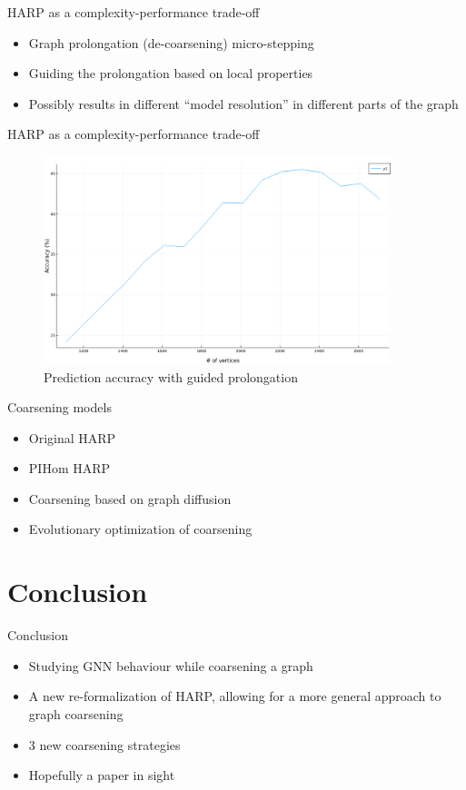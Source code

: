 \documentclass[10pt]{beamer}
\begin{document}
\begin{frame}{HARP as a complexity-performance trade-off}
	\begin{itemize}
		\item Graph prolongation (de-coarsening) micro-stepping
		\item Guiding the prolongation based on local properties
		\item Possibly results in different \enquote{model resolution} in different parts of the graph
	\end{itemize}
\end{frame}

\begin{frame}{HARP as a complexity-performance trade-off}
	\begin{figure}
		\centering
		\includegraphics[width=0.9\textwidth]{images/accuracy-size.png}
		\caption{Prediction accuracy with guided prolongation}
	\end{figure}
\end{frame}

\begin{frame}{Coarsening models}
	\begin{itemize}
		\item Original HARP
		\item PIHom HARP
		\item Coarsening based on graph diffusion
		\item Evolutionary optimization of coarsening
	\end{itemize}
\end{frame}

\section{Conclusion}

\begin{frame}{Conclusion}
	\centering
	\begin{itemize}
		\item Studying GNN behaviour while coarsening a graph
		\item A new re-formalization of HARP, allowing for a more general approach to graph coarsening
		\item 3 new coarsening strategies
		\item Hopefully a paper in sight
	\end{itemize}
\end{frame}
\end{document}
